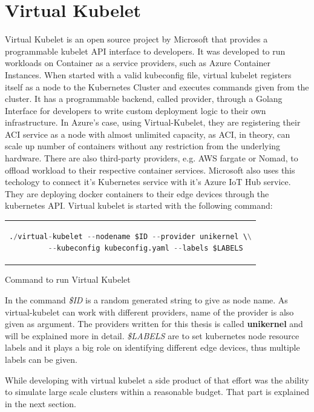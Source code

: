 \section{Virtual Kubelet}
Virtual Kubelet\cite{virtual} is an open source project by Microsoft that provides a programmable kubelet API interface to developers. It was developed to run workloads on Container as a service providers, such as Azure Container Instances. When started with a valid kubeconfig file, virtual kubelet registers itself as a node to the Kubernetes Cluster and executes commands given from the cluster. It has a programmable backend, called provider, through a Golang Interface for developers to write custom deployment logic to their own infrastructure. In Azure's case, using Virtual-Kubelet, they are registering their ACI service as a node with almost unlimited capacity, as ACI, in theory, can scale up number of containers without any restriction from the underlying hardware. There are also third-party providers, e.g. AWS fargate or Nomad, to offload workload to their respective container services. Microsoft also uses this techology to connect it's Kubernetes service with it's Azure IoT Hub service.\cite{Chandra2019} They are deploying docker containers to their edge devices through the kubernetes API. Virtual kubelet is started with the following command:
\begin{code}[htpb]
  \centering
  \begin{tabular}{c}
    \begin{lstlisting}[language=python]
      ./virtual-kubelet --nodename $ID --provider unikernel \\
       --kubeconfig kubeconfig.yaml --labels $LABELS
      \end{lstlisting}
\end{tabular}
\caption{Command to run Virtual Kubelet}\label{lst:vkcommand}
\end{code}


In the command \textit{\$ID} is a random generated string to give as node name. As virtual-kubelet can work with different providers, name of the provider is also given as argument. The providers written for this thesis is called \textbf{unikernel} and will be explained more in detail. \textit{\$LABELS} are to set kubernetes node resource labels and it plays a big role on identifying different edge devices, thus multiple labels can be given.

While developing with virtual kubelet a side product of that effort was the ability to simulate large scale clusters within a reasonable budget. That part is explained in the next section.
